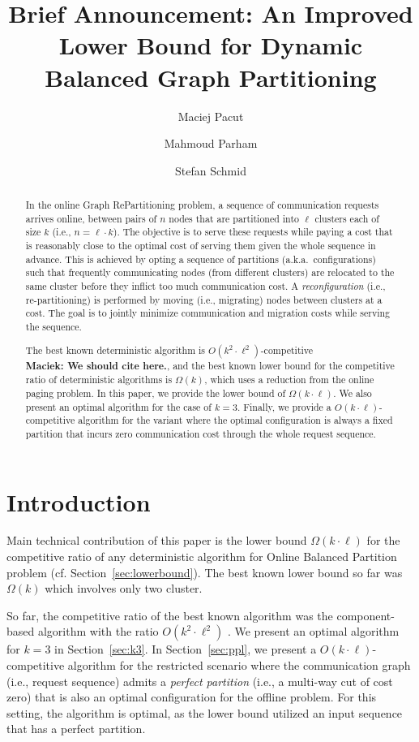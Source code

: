 \documentclass[manuscript,screen=true]{acmart}
\title{Brief Announcement: An Improved Lower Bound for Dynamic Balanced Graph Partitioning}
\author{Maciej Pacut}
\affiliation{%
  \institution{Faculty of Computer Science, University of Vienna}
  \country{Austria}
}
\author{Mahmoud Parham}
\affiliation{%
  \institution{Faculty of Computer Science, University of Vienna}
  \country{Austria}
}
\author{Stefan Schmid}
\affiliation{%
  \institution{Faculty of Computer Science, University of Vienna}
  \country{Austria}
}
\newcommand\maciek[1]{\color{brown}\textbf{\\ Maciek: #1}\color{black}}
\begin{document}
\begin{abstract}
  In the online Graph RePartitioning problem,
  a sequence of communication requests arrives online,
  between pairs of $n$ nodes that are partitioned into $\ell$ clusters
  each of size $k$ (i.e., $n = \ell \cdot k$).
  The objective is to serve these requests while paying a cost that is reasonably close to the optimal cost of serving them given  the whole sequence in advance. 
  This is achieved by opting a sequence of  partitions (a.k.a.~configurations)
  such that frequently communicating nodes (from different clusters)
  are relocated to the same cluster before they inflict too much communication cost.
  A \emph{reconfiguration} (i.e., re-partitioning) is performed by
  moving (i.e., migrating) nodes between clusters at a cost.
  The goal is to jointly minimize communication and migration costs while serving the sequence.

	The best known deterministic algorithm is $O(k^2\cdot \ell^2)$-competitive \cite{?????} \maciek{We should cite \cite{repartition-disc} here.},
	and the best known lower bound for the competitive ratio of
	deterministic algorithms is $\Omega(k)$,
	which uses a reduction from the online paging problem.
	  In this paper, we provide the lower bound of $\Omega(k\cdot \ell)$.
    We also present an optimal algorithm for the case of $k=3$.
  Finally,
  we provide a $O(k\cdot \ell)$-competitive algorithm for the variant
  where the optimal configuration is always a fixed partition
  that incurs zero communication cost through the whole request sequence.
\end{abstract}
    
\maketitle
    
\renewcommand{\shortauthors}{M.~Pacut, M.~Parham, S.~Schmid}

\section{Introduction}

Main technical contribution of this paper is the lower bound $\Omega(k\cdot\ell)$ for the competitive ratio of any deterministic algorithm for Online Balanced Partition problem (cf. Section~\ref{sec:lowerbound}).
The best known lower bound so far was $\Omega(k)$ \cite{repartition-disc}
which involves only two cluster.


So far, the competitive ratio of the best known algorithm was the component-based algorithm with the ratio $O(k^2\cdot \ell^2)$ \cite{repartition-disc}.
We present an optimal algorithm for $k=3$ in Section~\ref{sec:k3}.
In Section~\ref{sec:ppl}, we present a $O(k\cdot \ell)$-competitive algorithm for the restricted scenario
where the communication graph (i.e., request sequence) admits a \emph{perfect partition} (i.e., a multi-way cut of cost zero) that is also an optimal configuration for the offline problem.
For this setting, the algorithm is optimal, as the lower bound utilized an input sequence that has a perfect partition.
\end{document}
